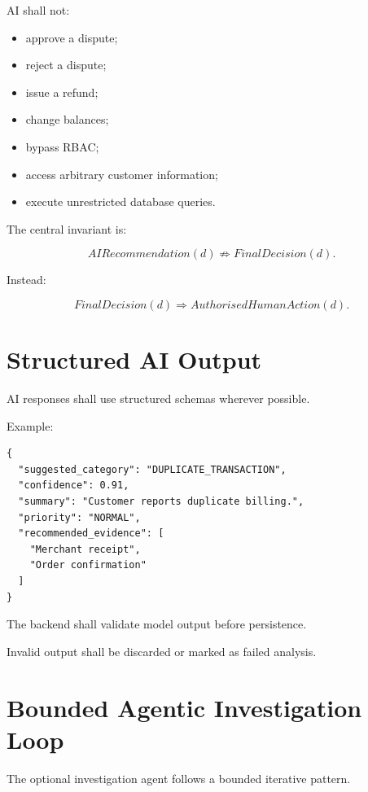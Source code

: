 \documentclass[11pt,a4paper]{article}
\begin{document}
AI shall not:

\begin{itemize}
    \item approve a dispute;
    \item reject a dispute;
    \item issue a refund;
    \item change balances;
    \item bypass RBAC;
    \item access arbitrary customer information;
    \item execute unrestricted database queries.
\end{itemize}

The central invariant is:

\[
AIRecommendation(d)
\not\Rightarrow
FinalDecision(d).
\]

Instead:

\[
FinalDecision(d)
\Rightarrow
AuthorisedHumanAction(d).
\]

\section{Structured AI Output}

AI responses shall use structured schemas wherever possible.

Example:

\begin{lstlisting}
{
  "suggested_category": "DUPLICATE_TRANSACTION",
  "confidence": 0.91,
  "summary": "Customer reports duplicate billing.",
  "priority": "NORMAL",
  "recommended_evidence": [
    "Merchant receipt",
    "Order confirmation"
  ]
}
\end{lstlisting}

The backend shall validate model output before persistence.

Invalid output shall be discarded or marked as failed analysis.

\section{Bounded Agentic Investigation Loop}

The optional investigation agent follows a bounded iterative pattern.
\end{document}
